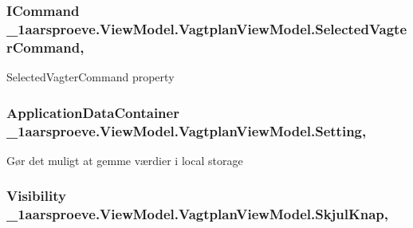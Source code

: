 \subsubsection[{Selected\+Vagter\+Command}]{\setlength{\rightskip}{0pt plus 5cm}I\+Command \+\_\+1aarsproeve.\+View\+Model.\+Vagtplan\+View\+Model.\+Selected\+Vagter\+Command\hspace{0.3cm}{\ttfamily [get]}, {\ttfamily [set]}}\label{class__1aarsproeve_1_1_view_model_1_1_vagtplan_view_model_aa46683f207146cac5e2d09555727d8f9}


Selected\+Vagter\+Command property 

\hypertarget{class__1aarsproeve_1_1_view_model_1_1_vagtplan_view_model_aa5e675ea6389cdc802698037ced2e091}{}
\subsubsection[{Setting}]{\setlength{\rightskip}{0pt plus 5cm}Application\+Data\+Container \+\_\+1aarsproeve.\+View\+Model.\+Vagtplan\+View\+Model.\+Setting\hspace{0.3cm}{\ttfamily [get]}, {\ttfamily [set]}}\label{class__1aarsproeve_1_1_view_model_1_1_vagtplan_view_model_aa5e675ea6389cdc802698037ced2e091}


Gør det muligt at gemme værdier i local storage 

\hypertarget{class__1aarsproeve_1_1_view_model_1_1_vagtplan_view_model_a84ab9afdefc9e4602b3f9864de570a21}{}
\subsubsection[{Skjul\+Knap}]{\setlength{\rightskip}{0pt plus 5cm}Visibility \+\_\+1aarsproeve.\+View\+Model.\+Vagtplan\+View\+Model.\+Skjul\+Knap\hspace{0.3cm}{\ttfamily [get]}, {\ttfamily [set]}}\label{class__1aarsproeve_1_1_view_model_1_1_vagtplan_view_model_a84ab9afdefc9e4602b3f9864de570a21}


